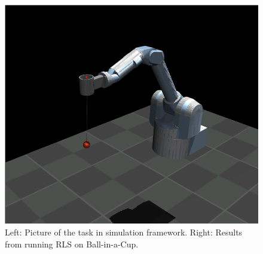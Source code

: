 \begin{figure}
    \centering
    \begin{minipage}{0.5\textwidth}
      \centering
      \includegraphics[scale=0.7]{figures/ball_in_a_cup.png}
      \hspace{1cm}                       
    \end{minipage}\hfill
    \begin{minipage}{0.45\textwidth}
      \centering
      \hspace{1cm}                       
    \end{minipage}
     \caption{\small
       {\color{gray!25!black!60} Left:}
       Picture of the task in simulation framework.       
       {\color{gray!25!black!60} Right:}
       Results from running RLS on Ball-in-a-Cup.       
     }
     \label{fig:reaching_result}      
\end{figure}

%
%
%
